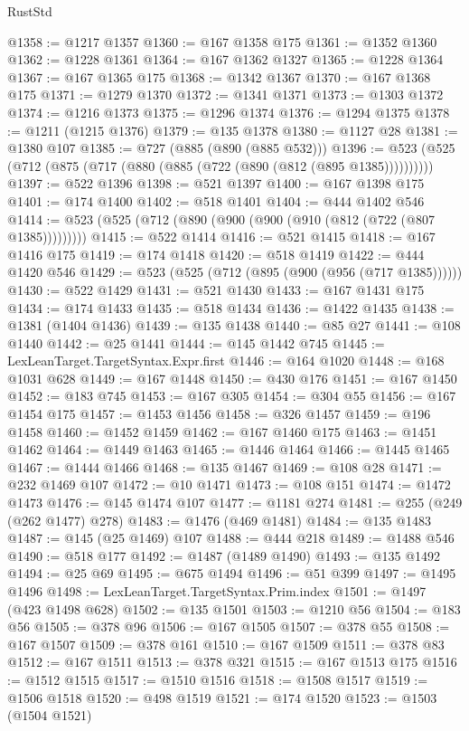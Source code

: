 \begin{lexlean}{RustStd}
\begin{coremodule}
{\begin{coremodule}
{{{{{{{{{{{{{{{{{{{{{{{{{{{{{{{{{{@1358 := @1217 @1357
@1360 := @167 @1358 @175
@1361 := @1352 @1360
@1362 := @1228 @1361
@1364 := @167 @1362 @1327
@1365 := @1228 @1364
@1367 := @167 @1365 @175
@1368 := @1342 @1367
@1370 := @167 @1368 @175
@1371 := @1279 @1370
@1372 := @1341 @1371
@1373 := @1303 @1372
@1374 := @1216 @1373
@1375 := @1296 @1374
@1376 := @1294 @1375
@1378 := @1211 (@1215 @1376)
@1379 := @135 @1378
@1380 := @1127 @28
@1381 := @1380 @107
@1385 := @727 (@885 (@890 (@885 @532)))
@1396 := @523 (@525 (@712 (@875 (@717 (@880 (@885 (@722 (@890 (@812 (@895 @1385))))))))))
@1397 := @522 @1396
@1398 := @521 @1397
@1400 := @167 @1398 @175
@1401 := @174 @1400
@1402 := @518 @1401
@1404 := @444 @1402 @546
@1414 := @523 (@525 (@712 (@890 (@900 (@900 (@910 (@812 (@722 (@807 @1385)))))))))
@1415 := @522 @1414
@1416 := @521 @1415
@1418 := @167 @1416 @175
@1419 := @174 @1418
@1420 := @518 @1419
@1422 := @444 @1420 @546
@1429 := @523 (@525 (@712 (@895 (@900 (@956 (@717 @1385))))))
@1430 := @522 @1429
@1431 := @521 @1430
@1433 := @167 @1431 @175
@1434 := @174 @1433
@1435 := @518 @1434
@1436 := @1422 @1435
@1438 := @1381 (@1404 @1436)
@1439 := @135 @1438
@1440 := @85 @27
@1441 := @108 @1440
@1442 := @25 @1441
@1444 := @145 @1442 @745
@1445 := LexLeanTarget.TargetSyntax.Expr.first
@1446 := @164 @1020
@1448 := @168 @1031 @628
@1449 := @167 @1448
@1450 := @430 @176
@1451 := @167 @1450
@1452 := @183 @745
@1453 := @167 @305
@1454 := @304 @55
@1456 := @167 @1454 @175
@1457 := @1453 @1456
@1458 := @326 @1457
@1459 := @196 @1458
@1460 := @1452 @1459
@1462 := @167 @1460 @175
@1463 := @1451 @1462
@1464 := @1449 @1463
@1465 := @1446 @1464
@1466 := @1445 @1465
@1467 := @1444 @1466
@1468 := @135 @1467
@1469 := @108 @28
@1471 := @232 @1469 @107
@1472 := @10 @1471
@1473 := @108 @151
@1474 := @1472 @1473
@1476 := @145 @1474 @107
@1477 := @1181 @274
@1481 := @255 (@249 (@262 @1477) @278)
@1483 := @1476 (@469 @1481)
@1484 := @135 @1483
@1487 := @145 (@25 @1469) @107
@1488 := @444 @218
@1489 := @1488 @546
@1490 := @518 @177
@1492 := @1487 (@1489 @1490)
@1493 := @135 @1492
@1494 := @25 @69
@1495 := @675 @1494
@1496 := @51 @399
@1497 := @1495 @1496
@1498 := LexLeanTarget.TargetSyntax.Prim.index
@1501 := @1497 (@423 @1498 @628)
@1502 := @135 @1501
@1503 := @1210 @56
@1504 := @183 @56
@1505 := @378 @96
@1506 := @167 @1505
@1507 := @378 @55
@1508 := @167 @1507
@1509 := @378 @161
@1510 := @167 @1509
@1511 := @378 @83
@1512 := @167 @1511
@1513 := @378 @321
@1515 := @167 @1513 @175
@1516 := @1512 @1515
@1517 := @1510 @1516
@1518 := @1508 @1517
@1519 := @1506 @1518
@1520 := @498 @1519
@1521 := @174 @1520
@1523 := @1503 (@1504 @1521)
}}}}}}}}}}}}}}}}}}}}}}}}}}}}}}}}}}
\end{coremodule}}
\end{coremodule}
\end{lexlean}

